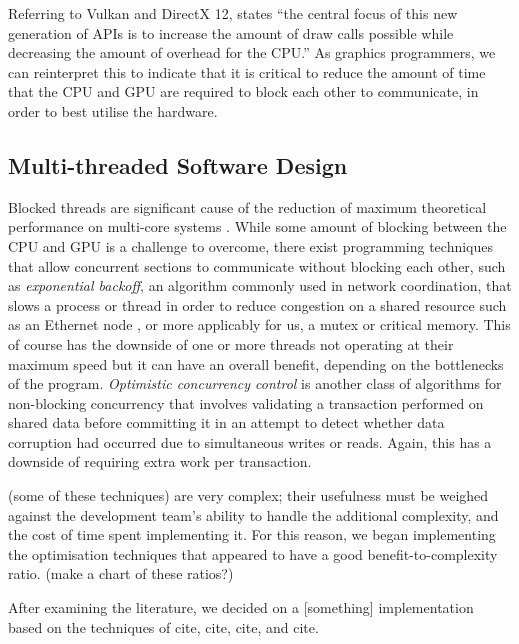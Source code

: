 \documentclass[11pt, a4paper, twocolumn]{article}
\begin{document}
Referring to Vulkan and DirectX 12, \citet{Joseph2016} states ``the central focus of this new generation of APIs is to increase the amount of draw calls possible while decreasing the amount of overhead for the CPU.'' As graphics programmers, we can reinterpret this to indicate that it is critical to reduce the amount of time that the CPU and GPU are required to block each other to communicate, in order to best utilise the hardware.

\subsection{Multi-threaded Software Design}

Blocked threads are significant cause of the reduction of maximum theoretical performance on multi-core systems \citep{Alemany1992}. While some amount of blocking between the CPU and GPU is a challenge to overcome, there exist programming techniques that allow concurrent sections to communicate without blocking each other, such as \emph{exponential backoff}, an algorithm commonly used in network coordination, that slows a process or thread in order to reduce congestion on a shared resource such as an Ethernet node \citep{Goodman2019}, or more applicably for us, a mutex or critical memory. This of course has the downside of one or more threads not operating at their maximum speed but it can have an overall benefit, depending on the bottlenecks of the program. \emph{Optimistic concurrency control} is another class of algorithms for non-blocking concurrency that involves validating a transaction performed on shared data before committing it \citep{Herlihy1993} in an attempt to detect whether data corruption had occurred due to simultaneous writes or reads. Again, this has a downside of requiring extra work per transaction.

(some of these techniques) are very complex; their usefulness must be weighed against the development team's ability to handle the additional complexity, and the cost of time spent implementing it. For this reason, we began implementing the optimisation techniques that appeared to have a good benefit-to-complexity ratio. (make a chart of these ratios?)

After examining the literature, we decided on a [something] implementation based on the techniques of cite, cite, cite, and cite.






\end{document}
